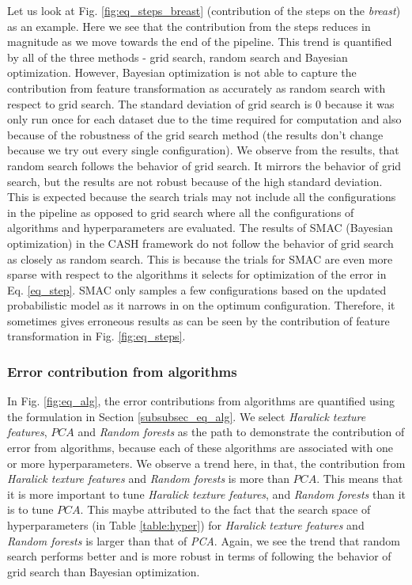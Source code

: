 Let us look at Fig. \ref{fig:eq_steps_breast} (contribution of the steps on the \textit{breast}) as an example. Here we see that the contribution from the steps reduces in magnitude as we move towards the end of the pipeline. This trend is quantified by all of the three methods - grid search, random search and Bayesian optimization. However, Bayesian optimization is not able to capture the contribution from feature transformation as accurately as random search with respect to grid search.
 The standard deviation of grid search is 0 because it was only run once for each dataset due to the time required for computation and also because of the robustness of the grid search method (the results don't change because we try out every single configuration). We observe from the results, that random search follows the behavior of grid search. It mirrors the behavior of grid search, but the results are not robust because of the high standard deviation. This is expected because the search trials may not include all the configurations in the pipeline as opposed to grid search where all the configurations of algorithms and hyperparameters are evaluated. The results of SMAC (Bayesian optimization) in the CASH framework do not follow the behavior of grid search as closely as random search. This is because the trials for SMAC are even more sparse with respect to the algorithms it selects for optimization of  the error in Eq. \ref{eq_step}. SMAC only samples a few configurations based on the updated probabilistic model as it narrows in on the optimum configuration. Therefore, it sometimes gives erroneous results as can be seen by the contribution of feature transformation in Fig. \ref{fig:eq_steps}.


\subsubsection{Error contribution from algorithms}

In Fig. \ref{fig:eq_alg}, the error contributions from algorithms are quantified using the formulation in Section \ref{subsubsec_eq_alg}. We select \textit{Haralick texture features}, $PCA$ and \textit{Random forests} as the path to demonstrate the contribution of error from algorithms, because each of these algorithms are associated with one or more hyperparameters. We observe a trend here, in that, the contribution from \textit{Haralick texture features} and \textit{Random forests} is more than $PCA$. This means that it is more important to tune \textit{Haralick texture features}, and \textit{Random forests} than it is to tune  $PCA$. This maybe attributed to the fact that the search space of hyperparameters (in Table \ref{table:hyper}) for \textit{Haralick texture features} and \textit{Random forests} is larger than that of \textit{PCA}. Again, we see the trend that random search performs better and is more robust in terms of following the behavior of grid search than Bayesian optimization.

